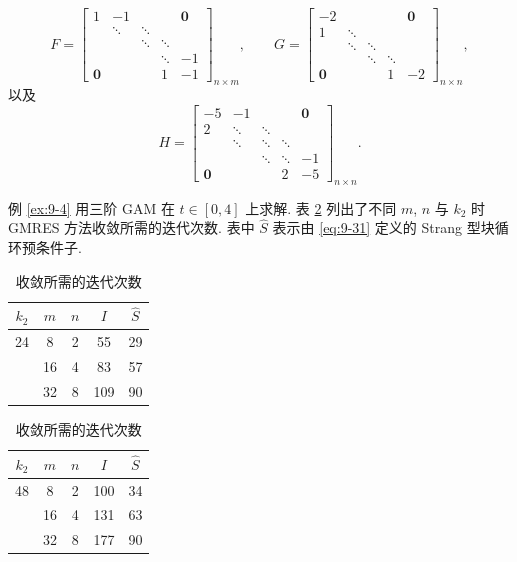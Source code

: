 \begin{example}
\[\]
\[
  F=\begin{bmatrix}
    1 & -1 & & & \mathbf{0}\\
    & \ddots & \ddots & & \\
    & & \ddots & \ddots & \\
    & & & \ddots & -1\\
    \mathbf{0} & & & 1 & -1
  \end{bmatrix}_{n\times m},\qquad
  G=\begin{bmatrix}
    -2 & & & & \mathbf{0}\\
    1 & \ddots & & & \\
    & \ddots & \ddots & & \\
    & & \ddots & \ddots & \\
    \mathbf{0} & & & 1 & -2
  \end{bmatrix}_{n\times n},
\]
以及
\[
  H=\begin{bmatrix}
    -5 & -1 & & & \mathbf{0}\\
    2 & \ddots & \ddots & & \\
    & \ddots & \ddots & \ddots & \\
    & & \ddots & \ddots & -1\\
    \mathbf{0} & & & 2 & -5
  \end{bmatrix}_{n\times n}.
\]
\end{example}

例 \ref{ex:9-4} 用三阶 GAM 在 $t\in[0,4]$ 上求解. 表 \ref{tab:9-4} 列出了不同 $m$, $n$ 与 $k_2$ 时 GMRES 方法收敛所需的迭代次数. 表中 $\widehat{S}$ 表示由 \eqref{eq:9-31} 定义的 Strang 型块循环预条件子.

\begin{table}[htbp]
  \centering
  \caption{收敛所需的迭代次数}
  \label{tab:9-4}
  \begin{tabular}{ccccc}
    \toprule
    $k_2$ & $m$ & $n$ & $I$ & $\widehat{S}$\\ \midrule
    24 & 8  & 2 & 55  & 29\\
       & 16 & 4 & 83  & 57\\
       & 32 & 8 & 109 & 90\\ \bottomrule
  \end{tabular}
  \hspace{2em}
  \begin{tabular}{ccccc}
    \toprule
    $k_2$ & $m$ & $n$ & $I$ & $\widehat{S}$\\ \midrule
    48 & 8  & 2 & 100 & 34\\
       & 16 & 4 & 131 & 63\\
       & 32 & 8 & 177 & 90\\ \bottomrule
  \end{tabular}
\end{table}
